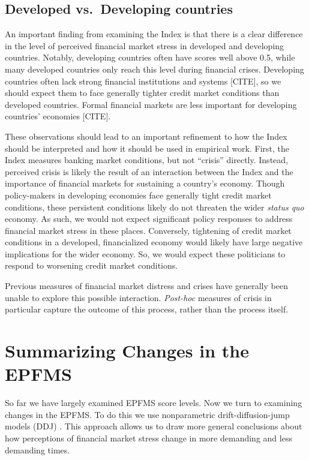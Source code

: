 \documentclass[]{article}
\begin{document}
\subsection{Developed vs.~Developing
countries}\label{developed-vs.developing-countries}

An important finding from examining the Index is that there is a clear
difference in the level of perceived financial market stress in
developed and developing countries. Notably, developing countries often
have scores well above 0.5, while many developed countries only reach
this level during financial crises. Developing countries often lack
strong financial institutions and systems {[}CITE{]}, so we should
expect them to face generally tighter credit market conditions than
developed countries. Formal financial markets are less important for
developing countries' economies {[}CITE{]}.

These observations should lead to an important refinement to how the
Index should be interpreted and how it should be used in empirical work.
First, the Index measures banking market conditions, but not ``crisis''
directly. Instead, perceived crisis is likely the result of an
interaction between the Index and the importance of financial markets
for sustaining a country's economy. Though policy-makers in developing
economies face generally tight credit market conditions, these
persistent conditions likely do not threaten the wider \emph{status quo}
economy. As such, we would not expect significant policy responses to
address financial market stress in these places. Conversely, tightening
of credit market conditions in a developed, financialized economy would
likely have large negative implications for the wider economy. So, we
would expect these politicians to respond to worsening credit market
conditions.

Previous measures of financial market distress and crises have generally
been unable to explore this possible interaction. \emph{Post-hoc}
measures of crisis in particular capture the outcome of this process,
rather than the process itself.

\section{Summarizing Changes in the EPFMS}

So far we have largely examined EPFMS score levels. Now we turn to examining changes in the EPFMS. To do this we use nonparametric drift-diffusion-jump models (DDJ) \citep{Carpenter2011,Dakos2012}. This approach allows us to draw more general conclusions about how perceptions of financial market stress change in more demanding and less demanding times.
\end{document}
